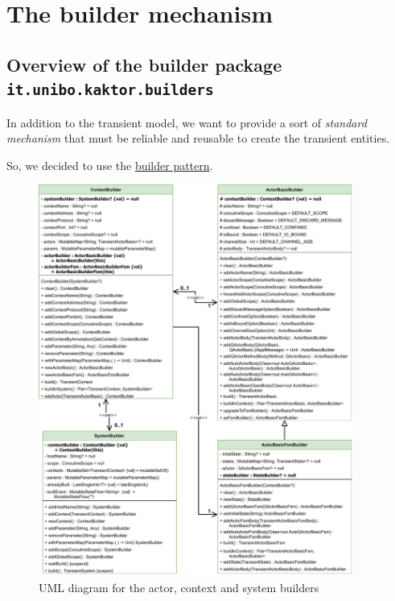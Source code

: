 \section{The builder mechanism}

\subsection{Overview of the builder package \texttt{it.unibo.kaktor.builders}}

In addition to the transient model, we want to provide a sort of \textit{standard mechanism} that must be reliable and reusable to create the transient entities.

So, we decided to use the \href{https://en.wikipedia.org/wiki/Builder_pattern}{builder pattern}.

\begin{figure}[h]
	\centering
	\includegraphics[width=0.92\textwidth]{img/[UML]it.unibo.kaktor.builders_actorb_contextb_systemb}
	\caption{UML diagram for the actor, context and system builders}
	\label{fig::builders_actorb_contextb_systemb}
\end{figure}

